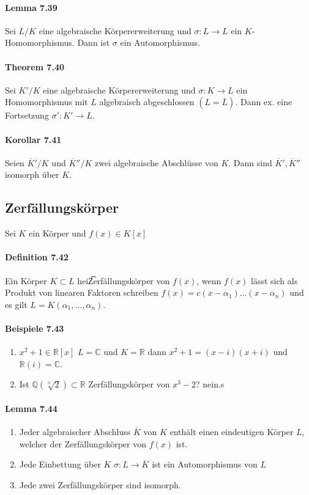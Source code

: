 \documentclass{scrartcl}
\newcommand{\q}[1]{\overline{#1}} %
\newcommand{\Q}{\mathbb{Q}}
\newcommand{\R}{\mathbb{R}}
\newcommand{\C}{\mathbb{C}}
\begin{document}
\paragraph{Lemma 7.39}
Sei $L/K$ eine algebraische Körpererweiterung und $\sigma: L \to L$ ein
$K$-Homomorphismus. Dann ist $\sigma$ ein Automorphismus.

\paragraph{Theorem 7.40}
Sei $K'/K$ eine algebraische Körpererweiterung und $\sigma: K \to L$ ein
Homomorphismus mit $L$ algebraisch abgeschlossen $(L=\q{L})$. Dann ex. eine
Fortsetzung $\sigma': K' \to L$.

\paragraph{Korollar 7.41}
Seien $\q{K}'/K$ und $\q{K}''/K$ zwei algebraische Abschlüsse von $K$. Dann sind
$\q{K}', \q{K}''$ isomorph über $K$.

\subsection{Zerfällungskörper}
Sei $K$ ein Körper und $f(x) \in K[x]$

\paragraph{Definition 7.42}
Ein Körper $K \subset L$ hei\t Zerfällungskörper von $f(x)$, wenn $f(x)$ lässt
sich als Produkt von linearen Faktoren schreiben $f(x)=c(x-\alpha_1) \dots
(x-\alpha_n)$ und es gilt $L = K(\alpha_1, \dots, \alpha_n)$.

\paragraph{Beispiele 7.43}
\begin{enumerate}{}
\item $x^2 + 1 \in \R[x]$ $L=\C$ und $K=\R$ dann
  $x^2+1=(x-i)(x+i)$ und $\R(i)=\C$.
\item Ist $\Q(\sqrt[3]{2}) \subset \R$ Zerfällungskörper von $x^3-2$? nein.s
\end{enumerate}

\paragraph{Lemma 7.44}
\begin{enumerate}{}
\item Jeder algebraischer Abschluss $\q{K}$ von $K$ enthält einen eindeutigen
  Körper $L$, welcher der Zerfällungskörper von $f(x)$ ist.
\item Jede Einbettung über $K$ $\sigma:L \to \q{K}$ ist ein Automorphismus von
  $L$
\item Jede zwei Zerfällungskörper sind isomorph.
\end{enumerate}
\end{document}
